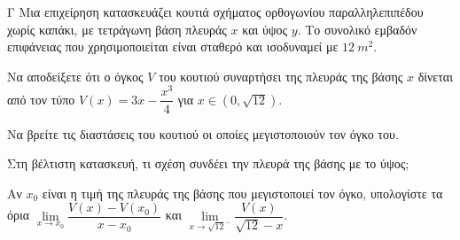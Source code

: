 \begin{thema}{Γ}
Μια επιχείρηση κατασκευάζει κουτιά σχήματος ορθογωνίου παραλληλεπιπέδου χωρίς καπάκι, με τετράγωνη βάση πλευράς $x$ και ύψος $y$. Το συνολικό εμβαδόν επιφάνειας που χρησιμοποιείται είναι σταθερό και ισοδυναμεί με $12\ \si{m^2}.$
\begin{erwthma}
  \item Να αποδείξετε ότι ο όγκος $V$ του κουτιού συναρτήσει της πλευράς της βάσης $x$ δίνεται από τον τύπο $V(x) = 3x - \dfrac{x^3}{4}$ για $x \in (0, \sqrt{12})$.
  \item Να βρείτε τις διαστάσεις του κουτιού οι οποίες μεγιστοποιούν τον όγκο του. 
  \item Στη βέλτιστη κατασκευή, τι σχέση συνδέει την πλευρά της βάσης με το ύψος;
  \item Αν $x_0$ είναι η τιμή της πλευράς της βάσης που μεγιστοποιεί τον όγκο, υπολογίστε τα όρια $\lim\limits_{x \to x_0} \dfrac{V(x) - V(x_0)}{x-x_0}$ και $\lim\limits_{x \to \sqrt{12}^-} \dfrac{V(x)}{\sqrt{12}-x}$.
\end{erwthma}
\end{thema}
